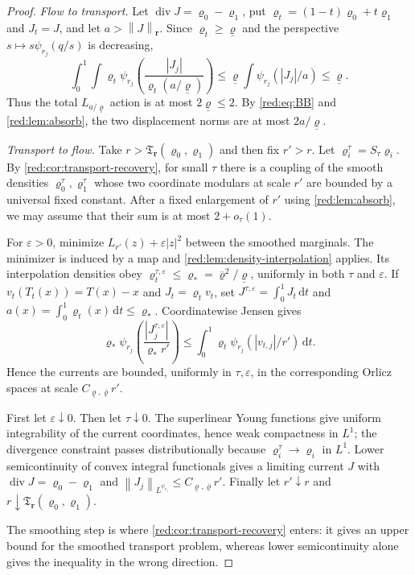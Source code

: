 \documentclass[11pt]{article}
\theoremstyle{definition}
\theoremstyle{remark}
\numberwithin{equation}{section}
\newcommand{\divv}{\operatorname{div}}
\newcommand{\norm}[1]{\left\|#1\right\|}
\newcommand{\dd}{\,\mathrm d}
\newcommand{\pa}[1]{\left(#1\right)}
\begin{document}
\begin{proof}
\emph{Flow to transport.}
Let $\divv J=\varrho_0-\varrho_1$, put
$\varrho_t=(1-t)\varrho_0+t\varrho_1$ and $J_t=J$, and let
$a>\norm J_{\boldsymbol r}$.  Since $\varrho_t\ge\underline\varrho$ and the perspective
$s\mapsto s\psi_{r_j}(q/s)$ is decreasing,
\[
 \int_0^1\!\int\varrho_t
 \psi_{r_j}\pa{\frac{|J_j|}{\varrho_t(a/\underline\varrho)}}
 \le\underline\varrho\int\psi_{r_j}(|J_j|/a)\le\underline\varrho.
\]
Thus the total $L_{a/\underline\varrho}$ action is at most $2\underline\varrho\le2$.  By
\eqref{red:eq:BB} and \cref{red:lem:absorb}, the two displacement norms are at most
$2a/\underline\varrho$.

\emph{Transport to flow.}
Take $r>\mathfrak T_{\boldsymbol r}(\varrho_0,\varrho_1)$ and then fix $r'>r$.
Let $\varrho_i^\tau=S_\tau\varrho_i$.  By
\cref{red:cor:transport-recovery}, for small $\tau$ there is a coupling of the
smooth densities $\varrho_0^\tau,\varrho_1^\tau$ whose two coordinate modulars
at scale $r'$ are bounded by a universal fixed constant.  After a fixed
enlargement of $r'$ using \cref{red:lem:absorb}, we may assume that their
sum is at most $2+o_\tau(1)$.

For $\varepsilon>0$, minimize
$L_{r'}(z)+\varepsilon|z|^2$ between the smoothed marginals.  The minimizer is
induced by a map and \cref{red:lem:density-interpolation} applies.  Its
interpolation densities obey
$\varrho_t^{\tau,\varepsilon}\le\varrho_*=\overline\varrho^2/\underline\varrho$, uniformly in both
$\tau$ and $\varepsilon$.  If
$v_t(T_t(x))=T(x)-x$ and $J_t=\varrho_tv_t$, set
$J^{\tau,\varepsilon}=\int_0^1J_t\dd t$ and
$a(x)=\int_0^1\varrho_t(x)\dd t\le\varrho_*$.  Coordinatewise Jensen gives
\[
 \varrho_*\psi_{r_j}\pa{\frac{|J_j^{\tau,\varepsilon}|}
 {\varrho_* r'}}
 \le\int_0^1\varrho_t\psi_{r_j}(|v_{t,j}|/r')\dd t.
\]
Hence the currents are bounded, uniformly in $\tau,\varepsilon$, in the
corresponding Orlicz spaces at scale $C_{\underline\varrho,\overline\varrho}r'$.

First let $\varepsilon\downarrow0$.  Then let $\tau\downarrow0$.  The
superlinear Young functions give uniform integrability of the current
coordinates, hence weak compactness in $L^1$; the divergence constraint
passes distributionally because
$\varrho_i^\tau\to\varrho_i$ in $L^1$.  Lower semicontinuity of convex integral
functionals gives a limiting current $J$ with
$\divv J=\varrho_0-\varrho_1$ and
$\norm{J_j}_{L^{\psi_{r_j}}}\le C_{\underline\varrho,\overline\varrho}r'$.  Finally let $r'\downarrow r$ and
$r\downarrow\mathfrak T_{\boldsymbol r}(\varrho_0,\varrho_1)$.

The smoothing step is where \cref{red:cor:transport-recovery} enters: it gives
an upper bound for the smoothed transport problem, whereas lower
semicontinuity alone gives the inequality in the wrong direction.
\end{proof}
\end{document}
